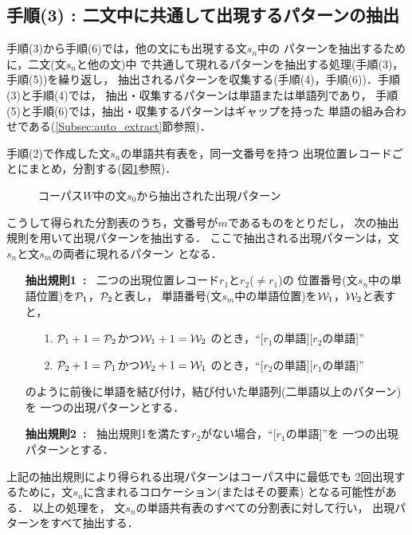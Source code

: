 \subsection*{手順(3) : 二文中に共通して出現するパターンの抽出}

手順(3)から手順(6)では，他の文にも出現する文$s_n$\hspace{-0.2mm}中の
パターンを抽出するために，二文(文$s_n$と\hspace{-0.2mm}他の文)中
で共通して現れるパターンを抽出する処理(手順(3)，手順(5))を繰り返し，
抽出されるパターンを収集する(手順(4)，手順(6))．手順(3)と手順(4)では，
抽出・収集するパターンは単語または単語列であり，
手順(5)と手順(6)では，抽出・収集するパターンはギャップを持った
単語の組み合わせである(\ref{Subsec:auto_extract}節参照)．

手順(2)で作成した文$s_n$の単語共有表を，同一文番号を持つ
出現位置レコードごとにまとめ，分割する(図\ref{Fig:tst2sp}参照)．
\begin{figure}[hbt]
\begin{center}
\end{center}
\caption{コーパス$W$中の文$s_0$から抽出された出現パターン}
\label{Fig:tst2sp}
\end{figure}
こうして得られた分割表のうち，文番号が$m$であるものをとりだし，
次の抽出規則を用いて出現パターンを抽出する．
ここで抽出される出現パターンは，文$s_n$と文$s_m$の両者に現れるパターン
となる．
\begin{itemize}
\item[{\bf 抽出規則1~:~}] 二つの出現位置レコード$r_1$と$r_2$($\neq r_1$)の
位置番号(文\hspace{-0.1mm}$s_n$\hspace{-0.1mm}中の単語位置)を${\cal P}_1$，${\cal P}_2$と表し，
単語番号(文$s_m$中の単語位置)を${\cal W}_1$，${\cal W}_2$と表すと，
\begin{itemize}
\item[1.] \({\cal P}_1 + 1 = {\cal P}_2\)かつ\({\cal W}_1 + 1 = {\cal W}_2\)
のとき，``[$r_1$の単語][$r_2$の単語]''
\item[2.] \({\cal P}_2 + 1 = {\cal P}_1\)かつ\({\cal W}_2 + 1 = {\cal W}_1\)
のとき，``[$r_2$の単語][$r_1$の単語]''
\end{itemize}
のように前後に単語を結び付け，結び付いた単語列(二単語以上のパターン)を
一つの出現パターンとする．
\item[{\bf 抽出規則2~:~}] 抽出規則1を満たす$r_2$がない場合，``[$r_1$の単語]''を
一つの出現パターンとする．
\end{itemize}
上記の抽出規則により得られる出現パターンはコーパス中に最低でも
2回出現するために，文$s_n$に含まれるコロケーション(またはその要素)
となる可能性がある．
以上の処理を，
文$s_n$の単語共有表のすべての分割表に対して行い，
出現パターンをすべて抽出する．

